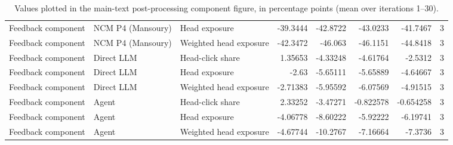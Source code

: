 \begin{table}[htbp!]
\begin{tabular}{lllrrrrr}
Feedback component & NCM P4 (Mansoury) & Head exposure & -39.3444 & -42.8722 & -43.0233 & -41.7467 & 3 \\
Feedback component & NCM P4 (Mansoury) & Weighted head exposure & -42.3472 & -46.063 & -46.1151 & -44.8418 & 3 \\
Feedback component & Direct LLM & Head-click share & 1.35653 & -4.33248 & -4.61764 & -2.5312 & 3 \\
Feedback component & Direct LLM & Head exposure & -2.63 & -5.65111 & -5.65889 & -4.64667 & 3 \\
Feedback component & Direct LLM & Weighted head exposure & -2.71383 & -5.95592 & -6.07569 & -4.91515 & 3 \\
Feedback component & Agent & Head-click share & 2.33252 & -3.47271 & -0.822578 & -0.654258 & 3 \\
Feedback component & Agent & Head exposure & -4.06778 & -8.60222 & -5.92222 & -6.19741 & 3 \\
Feedback component & Agent & Weighted head exposure & -4.67744 & -10.2767 & -7.16664 & -7.3736 & 3 \\
\hline
\end{tabular}
\caption{Values plotted in the main-text post-processing component figure, in percentage points (mean over iterations 1--30).}
\label{chap:results:tab:main_rq4_post_processing_components_values}
\end{table}
